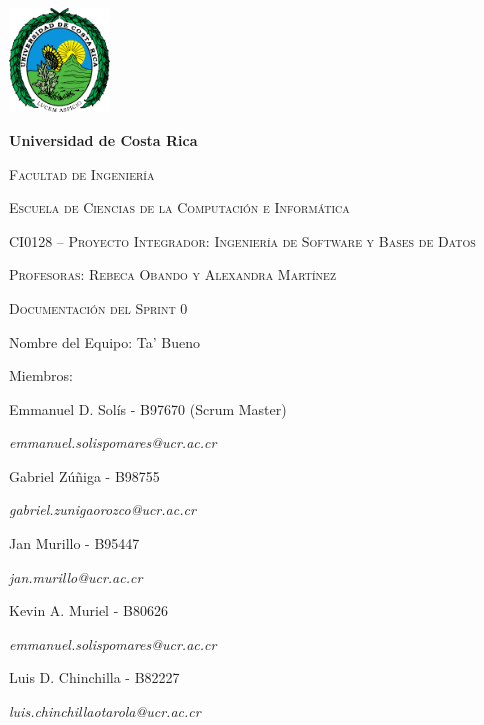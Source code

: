 \documentclass{article}
\begin{document}
\begin{titlepage}
\centering
{\includegraphics[width=0.2\textwidth]{logoUCR.png}\par}
\vspace{1cm}
{\bfseries\LARGE Universidad de Costa Rica \par}
\vspace{1cm}
{\scshape\Large Facultad de Ingenier\'ia \par}
{\scshape\Large Escuela de Ciencias de la Computaci\'on e Inform\'atica \par}
\vspace{1cm}
{\scshape\Large CI0128 – Proyecto Integrador: Ingeniería de Software y Bases de Datos \par}
{\scshape\Large Profesoras: Rebeca Obando y Alexandra Martínez \par}
\vspace{1cm}
{\scshape\Huge Documentación del Sprint 0 \par}
\vspace{1cm}
{\Large Nombre del Equipo: Ta' Bueno \par}
\vspace{0.5cm}
{\Large Miembros: \par}
{\Large Emmanuel D. Sol\'is - B97670 (Scrum Master)\par}
{\Large \textit{\color{blue}emmanuel.solispomares@ucr.ac.cr} \par}
{\Large Gabriel Zúñiga - B98755\par}
{\Large \textit{\color{blue}gabriel.zunigaorozco@ucr.ac.cr} \par}
{\Large Jan Murillo - B95447\par}
{\Large \textit{\color{blue}jan.murillo@ucr.ac.cr} \par}
{\Large Kevin A. Muriel - B80626\par}
{\Large \textit{\color{blue}emmanuel.solispomares@ucr.ac.cr} \par}
{\Large Luis D. Chinchilla - B82227\par}
{\Large \textit{\color{blue}luis.chinchillaotarola@ucr.ac.cr} \par}
\end{titlepage}
\end{document}
